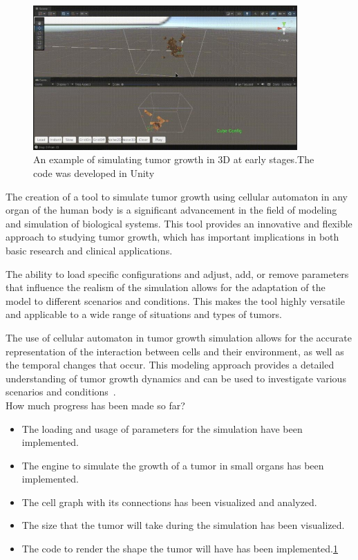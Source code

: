 \documentclass[a4paper,11pt]{article}
\begin{document}
{\begin{figure}[h]
  \centering
  \includegraphics[width=0.9\textwidth]{tumor.jpg}
  \caption{An example of simulating tumor growth in 3D at early stages.The code was developed in Unity}
  \label{fig:tumor}
\end{figure}

The creation of a tool to simulate tumor growth using cellular automaton in any organ of the human body is a significant advancement in the field of modeling and simulation of biological systems. This tool provides an innovative and flexible approach to studying tumor growth, which has important implications in both basic research and clinical applications.

The ability to load specific configurations and adjust, add, or remove parameters that influence the realism of the simulation allows for the adaptation of the model to different scenarios and conditions. This makes the tool highly versatile and applicable to a wide range of situations and types of tumors.

The use of cellular automaton in tumor growth simulation allows for the accurate representation of the interaction between cells and their environment, as well as the temporal changes that occur. This modeling approach provides a detailed understanding of tumor growth dynamics and can be used to investigate various scenarios and conditions~\cite{2}.\\

How much progress has been made so far?
\begin{itemize}
    \item The loading and usage of parameters for the simulation have been implemented.
    \item The engine to simulate the growth of a tumor in small organs has been implemented.
    \item The cell graph with its connections has been visualized and analyzed.
    \item The size that the tumor will take during the simulation has been visualized.
    \item The code to render the shape the tumor will have has been implemented.\ref{fig:tumor}
\end{itemize}

}
\end{document}
